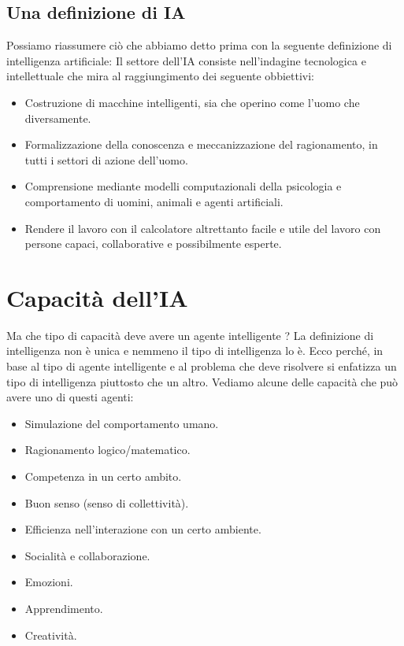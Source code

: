 \subsection{Una definizione di IA}
Possiamo riassumere ci\`o che abbiamo detto prima con la seguente definizione di
intelligenza artificiale: Il settore dell'IA consiste nell'indagine tecnologica e
intellettuale che mira al raggiungimento dei seguente obbiettivi:
\begin{itemize}
	\item Costruzione di macchine intelligenti, sia che operino come l'uomo che
	      diversamente.
	\item Formalizzazione della conoscenza e meccanizzazione del ragionamento, in
	      tutti i settori di azione dell'uomo.
	\item Comprensione mediante modelli computazionali della psicologia e
	      comportamento di uomini, animali e agenti artificiali.
	\item Rendere il lavoro con il calcolatore altrettanto facile e utile del lavoro
	      con persone capaci, collaborative e possibilmente esperte.
\end{itemize}

\section{Capacit\`a dell'IA}
Ma che tipo di capacit\`a deve avere un agente intelligente ? La definizione di
intelligenza non \`e unica e nemmeno il tipo di intelligenza lo \`e. Ecco perch\'e,
in base al tipo di agente intelligente e al problema che deve risolvere si enfatizza
un tipo di intelligenza piuttosto che un altro. Vediamo alcune delle capacit\`a che
pu\`o avere uno di questi agenti:
\begin{itemize}
	\item Simulazione del comportamento umano.
	\item Ragionamento logico/matematico.
	\item Competenza in un certo ambito.
	\item Buon senso (senso di collettivit\`a).
	\item Efficienza nell'interazione con un certo ambiente.
	\item Socialit\`a e collaborazione.
	\item Emozioni.
	\item Apprendimento.
	\item Creativit\`a.
\end{itemize}


